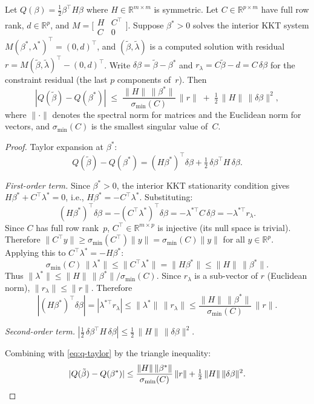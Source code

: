 \begin{lemma}\label{lem:q-error-first-order}
Let $Q(\beta) = \tfrac{1}{2}\beta^\top H \beta$ where
$H \in \mathbb{R}^{m \times m}$ is symmetric.
Let $C \in \mathbb{R}^{p \times m}$ have full row rank,
$d \in \mathbb{R}^p$, and
$M = \bigl[\begin{smallmatrix} H & C^\top \\ C & 0 \end{smallmatrix}\bigr]$.
Suppose $\beta^* > 0$ solves the interior KKT system $M(\beta^*,\lambda^*)^\top = (0,d)^\top$,
and $(\tilde\beta, \tilde\lambda)$ is a computed solution with residual
$r = M(\tilde\beta,\tilde\lambda)^\top - (0,d)^\top$.
Write $\delta\beta = \tilde\beta - \beta^*$ and
$r_\lambda = C\tilde\beta - d = C\,\delta\beta$ for the
constraint residual (the last $p$ components of~$r$).
Then
\[
  |Q(\tilde\beta) - Q(\beta^*)|
  \;\leq\;
  \frac{\|H\|\,\|\beta^*\|}{\sigma_{\min}(C)}\,\|r\|
  \;+\; \tfrac{1}{2}\,\|H\|\,\|\delta\beta\|^2,
\]
where $\|\cdot\|$ denotes the spectral norm for matrices and the
Euclidean norm for vectors, and $\sigma_{\min}(C)$ is the smallest
singular value of~$C$.
\end{lemma}

\begin{proof}
Taylor expansion at $\beta^*$:
\begin{equation}\label{eq:q-taylor}
  Q(\tilde\beta) - Q(\beta^*)
  = (H\beta^*)^\top \delta\beta + \tfrac{1}{2}\,\delta\beta^\top H\,\delta\beta.
\end{equation}

\emph{First-order term.}
Since $\beta^* > 0$, the interior KKT stationarity condition gives
$H\beta^* + C^\top\lambda^* = 0$, i.e.,
$H\beta^* = -C^\top\lambda^*$. Substituting:
\begin{equation}\label{eq:first-order-rewrite}
  (H\beta^*)^\top\delta\beta
  = -(C^\top\lambda^*)^\top\delta\beta
  = -\lambda^{*\top} C\,\delta\beta
  = -\lambda^{*\top} r_\lambda.
\end{equation}
Since $C$ has full row rank~$p$, $C^\top \in \mathbb{R}^{m \times p}$
is injective (its null space is trivial). Therefore
$\|C^\top y\| \geq \sigma_{\min}(C^\top)\|y\| = \sigma_{\min}(C)\|y\|$
for all $y \in \mathbb{R}^p$. Applying this to $C^\top\lambda^* = -H\beta^*$:
\[
  \sigma_{\min}(C)\,\|\lambda^*\|
  \leq \|C^\top\lambda^*\|
  = \|H\beta^*\|
  \leq \|H\|\,\|\beta^*\|.
\]
Thus $\|\lambda^*\| \leq \|H\|\,\|\beta^*\| / \sigma_{\min}(C)$.
Since $r_\lambda$ is a sub-vector of $r$ (Euclidean norm),
$\|r_\lambda\| \leq \|r\|$.
Therefore
\[
  |(H\beta^*)^\top\delta\beta|
  = |\lambda^{*\top} r_\lambda|
  \leq \|\lambda^*\|\,\|r_\lambda\|
  \leq \frac{\|H\|\,\|\beta^*\|}{\sigma_{\min}(C)}\,\|r\|.
\]

\emph{Second-order term.}
$|\tfrac{1}{2}\,\delta\beta^\top H\,\delta\beta|
  \leq \tfrac{1}{2}\,\|H\|\,\|\delta\beta\|^2$.

Combining with \eqref{eq:q-taylor} by the triangle inequality:
\[
  |Q(\tilde\beta) - Q(\beta^*)|
  \leq \frac{\|H\|\,\|\beta^*\|}{\sigma_{\min}(C)}\,\|r\|
  + \tfrac{1}{2}\,\|H\|\,\|\delta\beta\|^2. \qedhere
\]
\end{proof}


